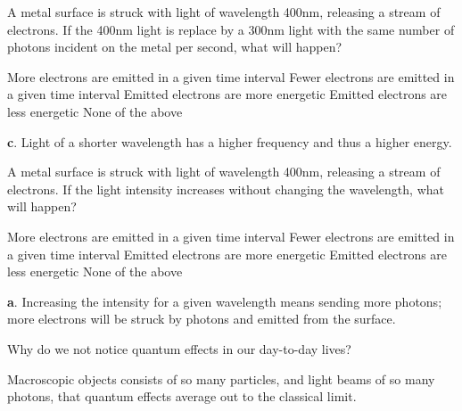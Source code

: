 \documentclass[12pt]{exam}
\begin{document}
\begin{questions}
	\question A metal surface is struck with light of wavelength 400nm, releasing a stream of electrons. If the 400nm light is replace by a 300nm light with the same number of photons incident on the metal per second, what will happen?
\begin{choices}
\choice More electrons are emitted in a given time interval
\choice Fewer electrons are emitted in a given time interval
\choice Emitted electrons are more energetic
\choice Emitted electrons are less energetic
\choice None of the above
\end{choices}
\begin{TheSolution}
\textbf{c}. Light of a shorter wavelength has a higher frequency and thus a higher energy.
\end{TheSolution}

\question A metal surface is struck with light of wavelength 400nm, releasing a stream of electrons. If the light intensity increases without changing the wavelength, what will happen?
\begin{choices}
\choice More electrons are emitted in a given time interval
\choice Fewer electrons are emitted in a given time interval
\choice Emitted electrons are more energetic
\choice Emitted electrons are less energetic
\choice None of the above
\end{choices}
\begin{TheSolution}
\textbf{a}. Increasing the intensity for a given wavelength means sending more photons; more electrons will be struck by photons and emitted from the surface.
\end{TheSolution}
	
	\question Why do we not notice quantum effects in our day-to-day lives?	
		\begin{TheSolution}
		Macroscopic objects consists of so many particles, and light beams of so many photons, that quantum effects average out to the classical limit.
		\end{TheSolution}
	
\end{questions}
\end{document}
